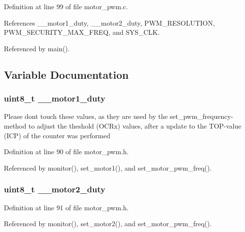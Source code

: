 Definition at line 99 of file motor\_\-pwm.c.

References \_\-\_\-motor1\_\-duty, \_\-\_\-motor2\_\-duty, PWM\_\-RESOLUTION, PWM\_\-SECURITY\_\-MAX\_\-FREQ, and SYS\_\-CLK.

Referenced by main().

\subsection{Variable Documentation}
\subsubsection{\setlength{\rightskip}{0pt plus 5cm}uint8\_\-t {\bf \_\-\_\-motor1\_\-duty}}\label{group__ro__motor__pwm_g09307813c6ec0c81f05b3275bc9c4c97}


Please dont touch these values, as they are used by the set\_\-pwm\_\-frequency-method to adjust the theshold (OCRx) values, after a update to the TOP-value (ICP) of the counter was performed 

Definition at line 90 of file motor\_\-pwm.h.

Referenced by monitor(), set\_\-motor1(), and set\_\-motor\_\-pwm\_\-freq().
\subsubsection{\setlength{\rightskip}{0pt plus 5cm}uint8\_\-t {\bf \_\-\_\-motor2\_\-duty}}\label{group__ro__motor__pwm_g19605cf4b1535650b5440318fd48bf35}




Definition at line 91 of file motor\_\-pwm.h.

Referenced by monitor(), set\_\-motor2(), and set\_\-motor\_\-pwm\_\-freq().